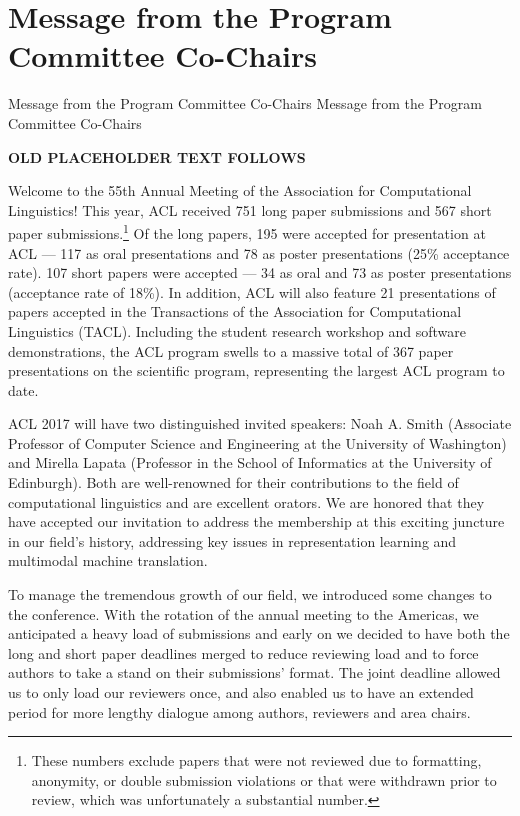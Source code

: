 \section{Message from the Program Committee Co-Chairs}\vspace{2em}
\setheaders%
    {Message from the Program Committee Co-Chairs}%
    {Message from the Program Committee Co-Chairs}
\thispagestyle{emptyheader}

\setlength{\parskip}{.7ex}

\textbf{OLD PLACEHOLDER TEXT FOLLOWS}


Welcome to the 55th Annual Meeting of the Association for
Computational Linguistics! This year, ACL received 751 long paper
submissions and 567 short paper submissions.\footnote{These numbers
  exclude papers that were not reviewed due to formatting, anonymity,
  or double submission violations or that were withdrawn prior to
  review, which was unfortunately a substantial number.} Of the long
papers, 195 were accepted for presentation at ACL — 117 as oral
presentations and 78 as poster presentations (25\% acceptance rate).
107 short papers were accepted — 34 as oral and 73 as poster
presentations (acceptance rate of 18\%). In addition, ACL will also
feature 21 presentations of papers accepted in the  Transactions
  of the Association for Computational Linguistics (TACL). Including
the student research workshop and software demonstrations, the ACL
program swells to a massive total of 367 paper presentations on the
scientific program, representing the largest ACL program to date.

ACL 2017 will have two distinguished invited speakers: Noah A. Smith
(Associate Professor of Computer Science and Engineering at the
University of Washington) and Mirella Lapata (Professor in the School
of Informatics at the University of Edinburgh).  Both are
well-renowned for their contributions to the field of computational
linguistics and are excellent orators.  We are honored that they have
accepted our invitation to address the membership at this exciting
juncture in our field's history, addressing key issues in
representation learning and multimodal machine translation.

To manage the tremendous growth of our field, we introduced some
changes to the conference. With the rotation of the annual meeting to
the Americas, we anticipated a heavy load of submissions and early on
we decided to have both the long and short paper deadlines merged to
reduce reviewing load and to force authors to take a stand on their
submissions' format.  The joint deadline allowed us to only load our
reviewers once, and also enabled us to have an extended period for
more lengthy dialogue among authors, reviewers and area chairs.  


